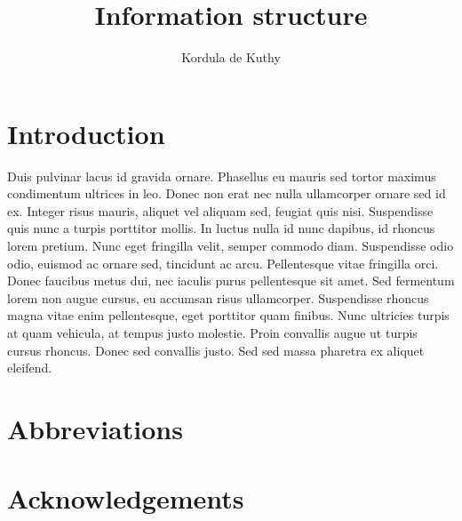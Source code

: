 \documentclass[output=paper]{langsci/langscibook}
\author{Kordula de Kuthy\affiliation{Universität Tübingen}}
\title{Information structure}
\begin{document}
\section{Introduction} 
Duis pulvinar lacus id gravida ornare. Phasellus eu mauris sed tortor maximus condimentum ultrices in leo. Donec non erat nec nulla ullamcorper ornare sed id ex. Integer risus mauris, aliquet vel aliquam sed, feugiat quis nisi. Suspendisse quis nunc a turpis porttitor mollis. In luctus nulla id nunc dapibus, id rhoncus lorem pretium. Nunc eget fringilla velit, semper commodo diam. Suspendisse odio odio, euismod ac ornare sed, tincidunt ac arcu. Pellentesque vitae fringilla orci. Donec faucibus metus dui, nec iaculis purus pellentesque sit amet. Sed fermentum lorem non augue cursus, eu accumsan risus ullamcorper. Suspendisse rhoncus magna vitae enim pellentesque, eget porttitor quam finibus. Nunc ultricies turpis at quam vehicula, at tempus justo molestie. Proin convallis augue ut turpis cursus rhoncus. Donec sed convallis justo. Sed sed massa pharetra ex aliquet eleifend. 

 
\section*{Abbreviations}
\section*{Acknowledgements}

\printbibliography[heading=subbibliography,notkeyword=this] 
\end{document}

